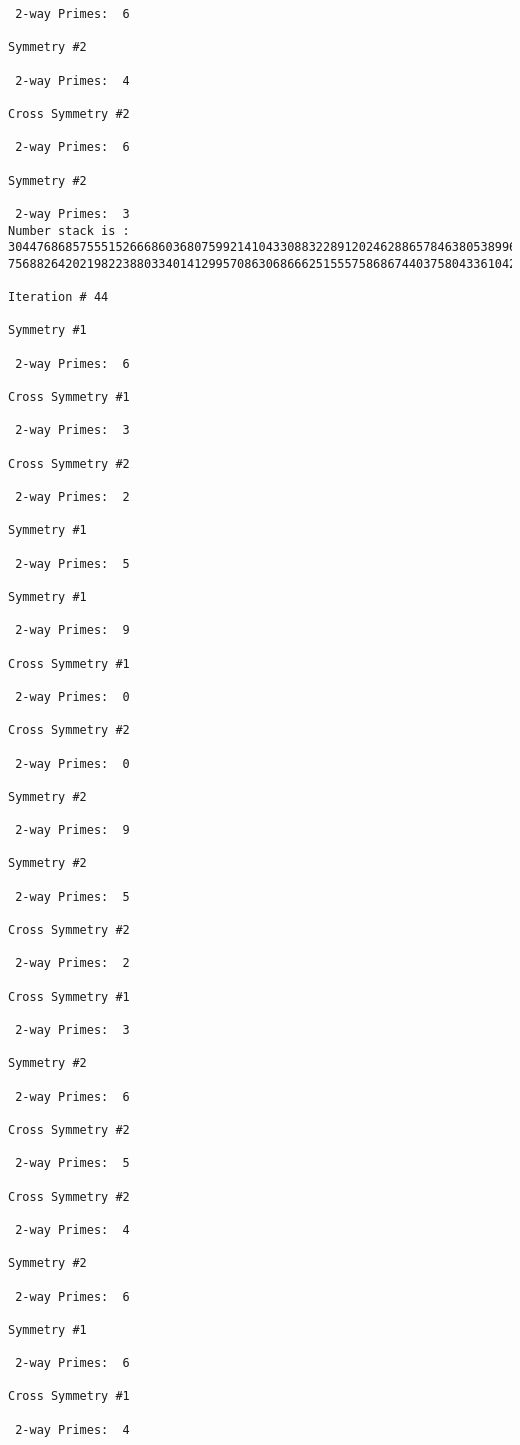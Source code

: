 \begin{verbatim}
 2-way Primes: 	6

Symmetry #2

 2-way Primes: 	4

Cross Symmetry #2

 2-way Primes: 	6

Symmetry #2

 2-way Primes: 	3
Number stack is :
30447686857555152666860368075992141043308832289120246288657846380538996794608835958544046240163340857
75688264202198223880334014129957086306866625155575868674403758043361042640445859538806497699835083648

Iteration #	44

Symmetry #1

 2-way Primes: 	6

Cross Symmetry #1

 2-way Primes: 	3

Cross Symmetry #2

 2-way Primes: 	2

Symmetry #1

 2-way Primes: 	5

Symmetry #1

 2-way Primes: 	9

Cross Symmetry #1

 2-way Primes: 	0

Cross Symmetry #2

 2-way Primes: 	0

Symmetry #2

 2-way Primes: 	9

Symmetry #2

 2-way Primes: 	5

Cross Symmetry #2

 2-way Primes: 	2

Cross Symmetry #1

 2-way Primes: 	3

Symmetry #2

 2-way Primes: 	6

Cross Symmetry #2

 2-way Primes: 	5

Cross Symmetry #2

 2-way Primes: 	4

Symmetry #2

 2-way Primes: 	6

Symmetry #1

 2-way Primes: 	6

Cross Symmetry #1

 2-way Primes: 	4


\end{verbatim}
